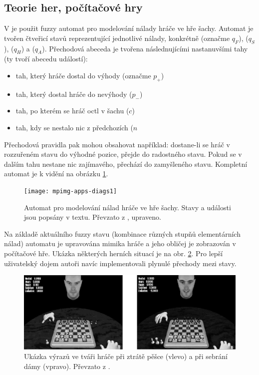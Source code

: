 \documentclass[a4paper,10pt]{article}
\begin{document}
\subsection{Teorie her, počítačové hry}
V \cite{AlvJoaCru-FuStMaAppEmoModEleGamCha} je použit fuzzy automat pro modelování nálady hráče ve hře šachy. Automat je tvořen čtveřicí stavů reprezentující jednotlivé  nálady, konkrétně  (označme $q_F$),  ($q_S$),  ($q_H$) a  ($q_A$). Přechodová abeceda je tvořena následnujícími nastanuvšími tahy (ty tvoří abecedu událostí):
\begin{itemize}
 \item tah, který hráče dostal do výhody (označme $p_{+}$)
 \item tah, který dostal hráče do nevýhody ($p_{-}$)
 \item tah, po kterém se hráč octl v šachu ($c$)
 \item tah, kdy se nestalo nic z předchozích ($n$
\end{itemize}

Přechodová pravidla pak mohou obsahovat například: dostane-li se hráč v rozzuřeném stavu do výhodné pozice, přejde do radostného stavu. Pokud se v dalším tahu nestane nic zajímavého, přechází do zamyšleného stavu. Kompletní automat je k vidění na obrázku \ref{img:ChessEmosFA}.

\begin{figure}
 \centering
 \texttt{[image: mpimg-apps-diags1]}
 
 \caption{Automat pro modelování nálad hráče ve hře šachy. Stavy a události jsou popsány v textu. Převzato z \cite{AlvJoaCru-FuStMaAppEmoModEleGamCha}, upraveno.}
 \label{img:ChessEmosFA}
\end{figure}

Na základě aktuálního fuzzy stavu (kombinace různých stupňů elementárních nálad) automatu je upravována mimika hráče a jeho obličej je zobrazován v počítačové hře. Ukázka některých herních situací je na obr. \ref{img:ChessEmosScreens}. Pro lepší uživatelský dojem autoři navíc implementovali plynulé přechody mezi stavy.

\begin{figure}
 \centering
 \includegraphics[width=\textwidth]{genimg-chess-emos-screens}
 
 \caption{Ukázka výrazů ve tváři hráče při ztrátě pěšce (vlevo) a při sebrání dámy (vpravo). Převzato z \cite{AlvJoaCru-FuStMaAppEmoModEleGamCha}.} \label{img:ChessEmosScreens}
\end{figure}
\end{document}
